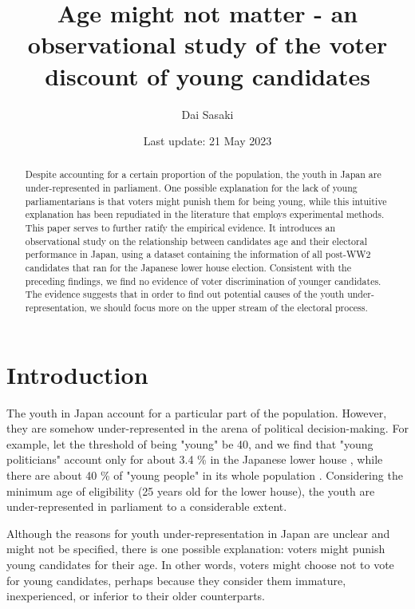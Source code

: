 \documentclass[a4paper, 12pt]{article}\usepackage[dvipdfmx]{graphicx}\usepackage[]{xcolor}
\title{Age might not matter - an observational study of the voter discount of young candidates}
\author{Dai Sasaki}
\date{Last update: 21 May 2023}
\begin{document}
\maketitle

\begin{abstract}
Despite accounting for a certain proportion of the population, the youth in Japan are under-represented in parliament. One possible explanation for the lack of young parliamentarians is that voters might punish them for being young, while this intuitive explanation has been repudiated in the literature that employs experimental methods. This paper serves to further ratify the empirical evidence. It introduces an observational study on the relationship between candidates age and their electoral performance in Japan, using a dataset containing the information of all post-WW2 candidates that ran for the Japanese lower house election. Consistent with the preceding findings, we find no evidence of voter discrimination of younger candidates. The evidence suggests that in order to find out potential causes of the youth under-representation, we should focus more on the upper stream of the electoral process.
\end{abstract}

\newpage

\tableofcontents

\newpage

\section{Introduction} \label{ch1}

The youth in Japan account for a particular part of the population. However, they are somehow under-represented in the arena of political decision-making. For example, let the threshold of being "young" be 40, and we find that "young politicians" account only for about 3.4 \% in the Japanese lower house \citep{shugiin2023}, while there are about 40 \% of "young people" in its whole population \citep*{mhlw2021}. Considering the minimum age of eligibility (25 years old for the lower house), the youth are under-represented in parliament to a considerable extent. 

Although the reasons for youth under-representation in Japan are unclear and might not be specified, there is one possible explanation: voters might punish young candidates for their age. In other words, voters might choose not to vote for young candidates, perhaps because they consider them immature, inexperienced, or inferior to their older counterparts. 
\end{document}
